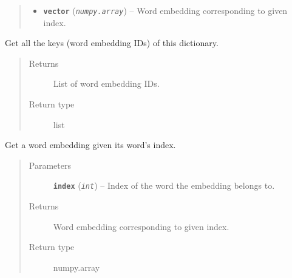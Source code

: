 \documentclass[letterpaper,10pt,english]{sphinxmanual}
\begin{document}
\begin{fulllineitems}
\begin{fulllineitems}
\begin{quote}
\begin{description}
\begin{itemize}
\item {} 
\textbf{\texttt{vector}} (\emph{\texttt{numpy.array}}) -- Word embedding corresponding to given index.

\end{itemize}

\end{description}\end{quote}

\end{fulllineitems}


\begin{fulllineitems}
\label{src.mapping:src.mapping.mapthreading.VectorDict.get_keys}
Get all the keys (word embedding IDs) of this dictionary.
\begin{quote}\begin{description}
\item[{Returns}] \leavevmode
List of word embedding IDs.

\item[{Return type}] \leavevmode
list

\end{description}\end{quote}

\end{fulllineitems}


\begin{fulllineitems}
\label{src.mapping:src.mapping.mapthreading.VectorDict.get_vector}
Get a word embedding given its word's index.
\begin{quote}\begin{description}
\item[{Parameters}] \leavevmode
\textbf{\texttt{index}} (\emph{\texttt{int}}) -- Index of the word the embedding belongs to.

\item[{Returns}] \leavevmode
Word embedding corresponding to given index.

\item[{Return type}] \leavevmode
numpy.array

\end{description}\end{quote}


\end{fulllineitems}
\end{fulllineitems}
\end{document}
